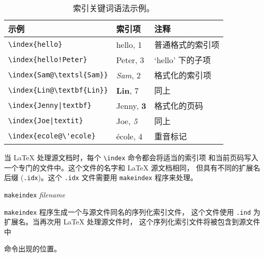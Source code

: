 \begin{table}[!tp]
\caption{索引关键词语法示例。} \label{index}
\begin{center}
\begin{tabular}{@{}lll@{}}
  \textbf{示例} &\textbf{索引项} &\textbf{注释}\\\hline
  \rule{0pt}{1.05em}\verb|\index{hello}| &hello, 1 & 普通格式的索引项\\
\verb|\index{hello!Peter}|   &\hspace*{2ex}Peter, 3 & `hello' 下的子项\\
\verb|\index{Sam@\textsl{Sam}}|     &\textsl{Sam}, 2& 格式化的索引项\\
\verb|\index{Lin@\textbf{Lin}}|     &\textbf{Lin}, 7& 同上\\
\verb.\index{Jenny|textbf}.     &Jenny, \textbf{3}& 格式化的页码\\
\verb.\index{Joe|textit}.     &Joe, \textit{5}& 同上\\
\verb.\index{ecole@\'ecole}.     &\'ecole, 4& 重音标记
\end{tabular}
\end{center}
\end{table}


当 \LaTeX{} 处理源文档时，每个 \verb|\index| 命令都会将适当的索引项
和当前页码写入一个专门的文件中。这个文件的名字和 \LaTeX{} 源文档相同，
但具有不同的扩展名后缀 (\verb|.idx|)。这个 \texttt{.idx} 文件需要用
 \texttt{makeindex} 程序来处理。


\begin{lscommand}
  \texttt{makeindex} \emph{filename}
\end{lscommand}
\texttt{makeindex} 程序生成一个与源文件同名的序列化索引文件，
这个文件使用 \texttt{.ind} 为扩展名。当再次用 \LaTeX{} 处理源文件时，
这个序列化索引文件将被包含到源文件中
\begin{lscommand}
\end{lscommand}
\noindent 命令出现的位置。

